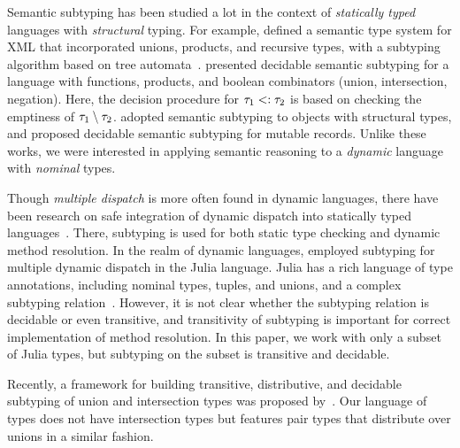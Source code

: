 Semantic subtyping has been studied a lot in the context of \emph{statically
typed} languages with \emph{structural} typing. 
For example, \citet{bib:Hosoya:2003:XDuce} defined 
a semantic type system for XML that incorporated unions, products,
and recursive types, with a subtyping algorithm based on tree 
automata~\cite{bib:Hosoya:2005:XML}.
\citet{bib:Frisch:2008:sem-sub} presented decidable semantic subtyping
for a language with functions, products, and boolean combinators 
(union, intersection, negation). Here, the decision procedure 
for $\tau_1 <: \tau_2$ is based on checking
the emptiness of $\tau_1 \setminus \tau_2$. 
\citet{bib:Dardha:2013:semsub-oo} adopted semantic subtyping
to objects with structural types, and \citet{bib:Ancona:2016:sem-sub-oo} 
proposed decidable semantic subtyping for mutable records.
Unlike these works, we were interested in applying semantic reasoning
to a \emph{dynamic} language with \emph{nominal} types.

Though \emph{multiple dispatch} is more often found in dynamic languages,
there have been research on safe integration of dynamic dispatch into
statically typed languages~\cite{bib:Chambers:1992:Cecil, 
Castagna:1992:COF:141471.141537, bib:Clifton:2000:MultiJava,
Park:2019:PSM:3302515.3290324}. There, subtyping is used for both
static type checking and dynamic method resolution.
In the realm of dynamic languages, \citet{Bezanson2015AbstractionIT} 
employed subtyping for multiple dynamic dispatch in the Julia language.
Julia has a rich language of type annotations, 
including nominal types, tuples, and unions, 
and a complex subtyping relation~\cite{ZappaNardelli:2018:JSR:3288538.3276483}. 
However, it is not clear whether the subtyping relation is decidable 
or even transitive, and transitivity of subtyping is important
for correct implementation of method resolution.
In this paper, we work with only a subset of Julia types, 
but subtyping on the subset is transitive and decidable.

Recently, a framework for building transitive, distributive,
and decidable subtyping of union and intersection types was proposed 
by~\citet{Muehlboeck:2018:EUI:3288538.3276482}.
Our language of types does not have intersection types but features
pair types that distribute over unions in a similar fashion.

